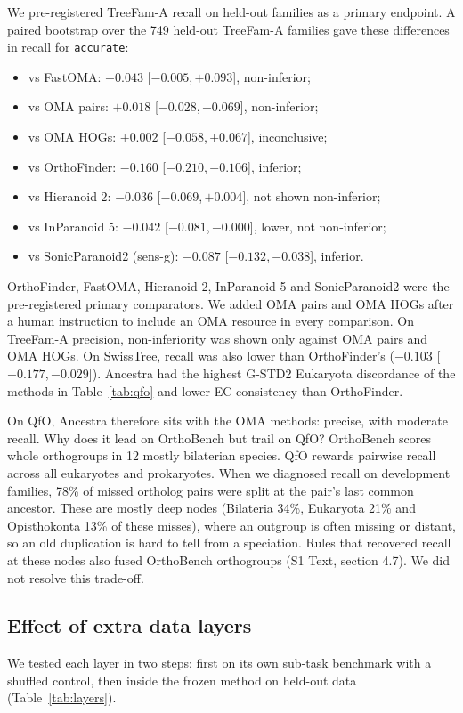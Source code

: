 \documentclass[10pt,letterpaper]{article}
\newcommand{\CI}[2]{[#1,\,#2]}
\begin{document}
We pre-registered TreeFam-A recall on held-out families as a primary endpoint. A paired bootstrap over the 749 held-out TreeFam-A families gave these differences in recall for \texttt{accurate}:
\begin{itemize}
\item vs FastOMA: $+0.043$ \CI{$-0.005$}{$+0.093$}, non-inferior;
\item vs OMA pairs: $+0.018$ \CI{$-0.028$}{$+0.069$}, non-inferior;
\item vs OMA HOGs: $+0.002$ \CI{$-0.058$}{$+0.067$}, inconclusive;
\item vs OrthoFinder: $-0.160$ \CI{$-0.210$}{$-0.106$}, inferior;
\item vs Hieranoid 2: $-0.036$ \CI{$-0.069$}{$+0.004$}, not shown non-inferior;
\item vs InParanoid 5: $-0.042$ \CI{$-0.081$}{$-0.000$}, lower, not non-inferior;
\item vs SonicParanoid2 (sens-g): $-0.087$ \CI{$-0.132$}{$-0.038$}, inferior.
\end{itemize}
OrthoFinder, FastOMA, Hieranoid 2, InParanoid 5 and SonicParanoid2 were the pre-registered primary comparators. We added OMA pairs and OMA HOGs after a human instruction to include an OMA resource in every comparison. On TreeFam-A precision, non-inferiority was shown only against OMA pairs and OMA HOGs. On SwissTree, recall was also lower than OrthoFinder's ($-0.103$ \CI{$-0.177$}{$-0.029$}). Ancestra had the highest G-STD2 Eukaryota discordance of the methods in Table~\ref{tab:qfo} and lower EC consistency than OrthoFinder.

On QfO, Ancestra therefore sits with the OMA methods: precise, with moderate recall. Why does it lead on OrthoBench but trail on QfO? OrthoBench scores whole orthogroups in 12 mostly bilaterian species. QfO rewards pairwise recall across all eukaryotes and prokaryotes. When we diagnosed recall on development families, 78\% of missed ortholog pairs were split at the pair's last common ancestor. These are mostly deep nodes (Bilateria 34\%, Eukaryota 21\% and Opisthokonta 13\% of these misses), where an outgroup is often missing or distant, so an old duplication is hard to tell from a speciation. Rules that recovered recall at these nodes also fused OrthoBench orthogroups (S1 Text, section 4.7). We did not resolve this trade-off.

\subsection*{Effect of extra data layers}
We tested each layer in two steps: first on its own sub-task benchmark with a shuffled control, then inside the frozen method on held-out data (Table~\ref{tab:layers}).
\end{document}
